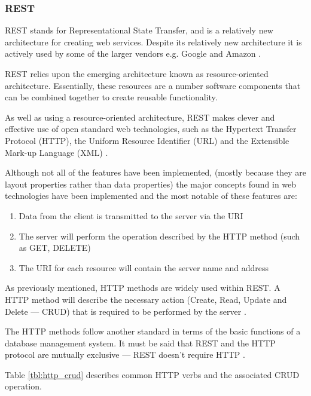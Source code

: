 \subsubsection{REST}

REST stands for Representational State Transfer, and is a relatively new 
architecture for creating web services. Despite its relatively new architecture
it is actively used by some of the larger vendors e.g. Google and Amazon 
\citep{dospinescu13}.

REST relies upon the emerging architecture known as resource-oriented 
architecture. Essentially, these resources are a number software components 
that can be combined together to create reusable functionality.

As well as using a resource-oriented architecture, REST makes clever and 
effective use of open standard web technologies, such as the Hypertext Transfer
Protocol (HTTP), the Uniform Resource Identifier (URL) and the Extensible 
Mark-up Language (XML) \citep{dospinescu13}.

Although not all of the features have been implemented, (mostly because they 
are layout properties rather than data properties) the major concepts found in
web technologies have been implemented and the most notable of these features 
are:

\begin{enumerate}
  \item Data from the client is transmitted to the server via the URI
  \item The server will perform the operation described by the HTTP method 
  (such as GET, DELETE)
  \item The URI for each resource will contain the server name and address
\end{enumerate}

As previously mentioned, HTTP methods are widely used within REST. A HTTP 
method will describe the necessary action (Create, Read, Update and Delete --- 
CRUD) that is required to be performed by the server \citep{dospinescu13}.

The HTTP methods follow another standard in terms of the basic functions of a 
database management system. It must be said that REST and the HTTP protocol are
mutually exclusive --- REST doesn't require HTTP \citep{dospinescu13}. 

Table \ref{tbl:http_crud} describes common HTTP verbs and the associated CRUD 
operation. 


